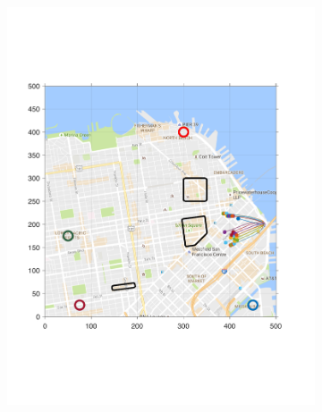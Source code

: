 \begin{figure}[!htb]
 \centering
\begin{subfigure}{\columnwidth}
  \includegraphics[width=\columnwidth]{figs/sf_d6sep0_s1}
  \subcaption{}
  \label{fig:sf_d6sep0_s1}
\end{subfigure}%
\begin{subfigure}{\columnwidth}

\end{subfigure}
\end{figure}
